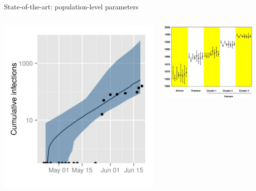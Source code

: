 \documentclass{beamer}
\begin{document}
\begin{frame}{State-of-the-art: population-level parameters}
    \begin{columns}
        \begin{column}{0.5\textwidth}
            \includegraphics[width=\textwidth]{cumulative}
        \end{column}
        \begin{column}{0.5\textwidth}
            \includegraphics[width=\textwidth]{tmrca}

\end{column}
\end{columns}
\end{frame}
\end{document}
